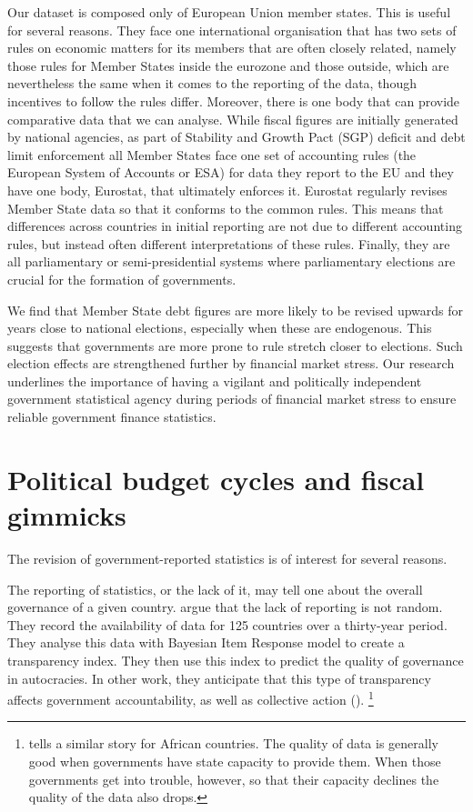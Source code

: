 \documentclass[]{article}
\begin{document}
Our dataset is composed only of European Union member states. This is useful for several reasons. They face one international organisation that has two sets of rules on economic matters for its members that are often closely related, namely those rules for Member States inside the eurozone and those outside, which are nevertheless the same when it comes to the reporting of the data, though incentives to follow the rules differ. Moreover, there is one body that can provide comparative data that we can analyse. While fiscal figures are initially generated by national agencies, as part of Stability and Growth Pact (SGP) deficit and debt limit enforcement all Member States face one set of accounting rules (the European System of Accounts or ESA) for data they report to the EU and they have one body, Eurostat, that ultimately enforces it. Eurostat regularly revises Member State data so that it conforms to the common rules. This means that differences across countries in initial reporting are not due to different accounting rules, but instead often different interpretations of these rules. Finally, they are all parliamentary or semi-presidential systems where parliamentary elections are crucial for the formation of governments.

We find that Member State debt figures are more likely to be revised upwards for years close to national elections, especially when these are endogenous. This suggests that governments are more prone to rule stretch closer to elections. Such election effects are strengthened further by financial market stress. Our research underlines the importance of having a vigilant and politically independent government statistical agency during periods of financial market stress to ensure reliable government finance statistics.

\section{Political budget cycles and fiscal gimmicks}

The revision of government-reported statistics is of interest for several reasons.

The reporting of statistics, or the lack of it, may tell one about the overall governance of a given country. \cite{Hollyer2014} argue that the lack of reporting is not random. They record the availability of data for 125 countries over a thirty-year period. They analyse this data with Bayesian Item Response model to create a transparency index. They then use this index to predict the quality of governance in autocracies. In other work, they anticipate that this type of transparency affects government accountability, as well as collective action (\cite{hollyerforthcoming}). \footnote{\cite{jervin2013} tells a similar story for African countries. The quality of data is generally good when governments have state capacity to provide them. When those governments get into trouble, however, so that their capacity declines the quality of the data also drops.}
\end{document}
